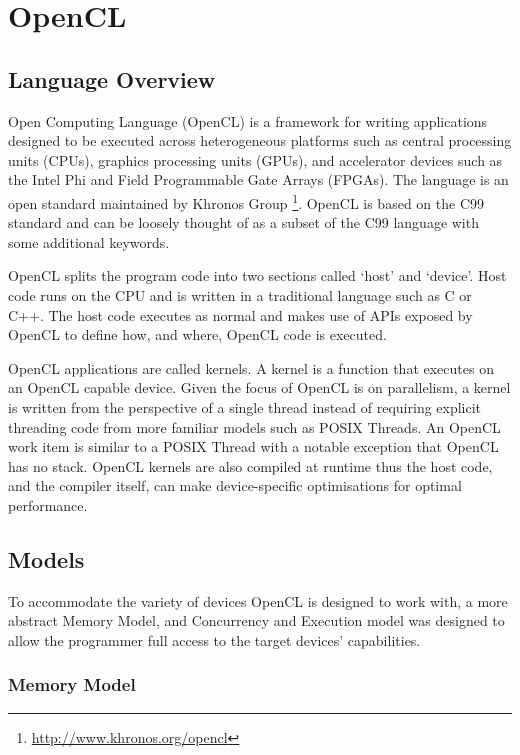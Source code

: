 \section{OpenCL}

\subsection{Language Overview}

Open Computing Language (OpenCL) is a framework for writing applications
designed to be executed across heterogeneous platforms such as central
processing units (CPUs), graphics processing units (GPUs), and accelerator
devices such as the Intel Phi and Field Programmable Gate Arrays (FPGAs). The
language is an open standard maintained by Khronos Group
\footnote{\url{http://www.khronos.org/opencl}}. OpenCL is based on the C99
standard and can be loosely thought of as a subset of the C99 language with some
additional keywords.

OpenCL splits the program code into two sections called `host' and `device'.
Host code runs on the CPU and is written in a traditional language such as C or
C++. The host code executes as normal and makes use of APIs exposed by OpenCL to
define how, and where, OpenCL code is executed.

OpenCL applications are called kernels. A kernel is a function that executes on
an OpenCL capable device. Given the focus of OpenCL is on parallelism, a kernel
is written from the perspective of a single thread instead of requiring explicit
threading code from more familiar models such as POSIX Threads. An OpenCL work
item is similar to a POSIX Thread with a notable exception that OpenCL has no
stack. OpenCL kernels are also compiled at runtime thus the host code, and the
compiler itself, can make device-specific optimisations for optimal performance.

\subsection{Models}

To accommodate the variety of devices OpenCL is designed to work with, a more
abstract Memory Model, and Concurrency and Execution model was designed to allow
the programmer full access to the target devices' capabilities.

\subsubsection{Memory Model}

